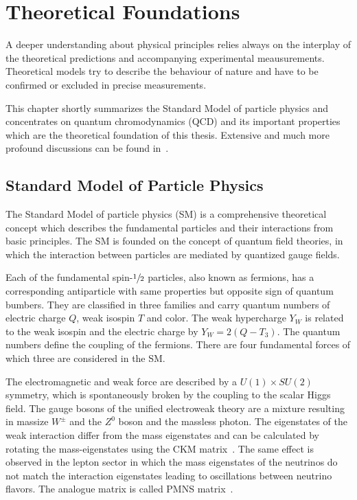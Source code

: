 
\chapter{Theoretical Foundations}
\label{sec:theoretical_foundations}

A deeper understanding about physical principles relies always on the interplay
of the theoretical predictions and accompanying experimental meausurements.
Theoretical models try to describe the behaviour of nature and have to be
confirmed or excluded in precise measurements.

This chapter shortly summarizes the Standard Model of particle physics and
concentrates on quantum chromodynamics (QCD) and its important properties which
are the theoretical foundation of this thesis. Extensive and much more profound
discussions can be found in~\cite{all_theory_used}.

\section{Standard Model of Particle Physics}

The Standard Model of particle physics (SM) is a comprehensive theoretical
concept which describes the fundamental particles and their interactions from
basic principles. The SM is founded on the concept of quantum field theories, in
which the interaction between particles are mediated by quantized gauge fields.

Each of the fundamental spin-$\sfrac{1}{2}$ particles, also known as fermions,
has a corresponding antiparticle with same properties but opposite sign of
quantum bumbers. They are classified in three families and carry quantum numbers
of electric charge $Q$, weak isospin $T$ and color. The weak hypercharge $Y_W$
is related to the weak isospin and the electric charge by $Y_W = 2(Q-T_3)$. The
quantum numbers define the coupling of the fermions. There are four fundamental
forces of which three are considered in the SM.

The electromagnetic and weak force are described by a $U(1)\times SU(2)$
symmetry, which is spontaneously broken by the coupling to the scalar Higgs
field. The gauge bosons of the unified electroweak theory are a mixture
resulting in massize $W^\pm$ and the $Z^0$ boson and the massless photon. The
eigenstates of the weak interaction differ from the mass eigenstates and can be
calculated by rotating the mass-eigenstates using the CKM
matrix~\cite{Cabibbo:1963yz,Kobayashi:1973fv}. The same effect is observed in
the lepton sector in which the mass eigenstates of the neutrinos do not match
the interaction eigenstates leading to oscillations between neutrino flavors.
The analogue matrix is called PMNS matrix~\cite{Maki:1962mu,Pontecorvo:1957qd}.

